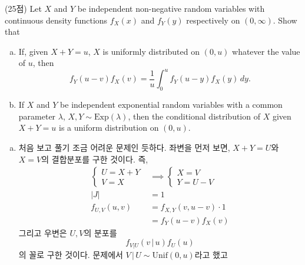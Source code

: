 \documentclass[answers]{exam}
\begin{document}
\newpage
{}
\begin{questions}
   \question
    (25점) Let $X$ and $Y$ be independent non-negative random variables with continuous density functions $f_{X}\left(x\right)$ and $f_{Y}\left(y\right)$ respectively on $\left(0,\infty\right)$. Show that
    \begin{enumerate}[(a)]
      \item If, given $X+Y=u$, $X$ is uniformly distributed on $(0,u)$ whatever the value of $u$, then
      $$
        f_{Y}\left(u-v\right)f_{X}\left(v\right) = \dfrac{1}{u}\int_{0}^{u}f_{Y}\left(u-y\right)f_{X}\left(y\right)\,dy.
      $$
      \item If $X$ and $Y$ be independent exponential random variables with a common parameter $\lambda$, $X,Y\sim \mathrm{Exp}\left(\lambda\right)$, then the conditional distribution of $X$ given $X+Y=u$ is a uniform distribution on $\left(0,u\right)$.
    \end{enumerate}
    \begin{solution}
      \begin{enumerate}[(a)]
        \item 처음 보고 풀기 조금 어려운 문제인 듯하다. 좌변을 먼저 보면, $X+Y=U$와 $X=V$의 결합분포를 구한 것이다. 즉,
        \begin{align}
          \begin{cases}U=X+Y\\V=X  \end{cases} &\implies \begin{cases}X=V\\Y=U-V \end{cases}\\
          \left|J\right| &= 1\\
          f_{U,V}\left(u,v\right) &= f_{X,Y}\left(v,u-v\right)\cdot 1\\
          &= f_{Y}\left(u-v\right)f_{X}\left(v\right)
        \end{align}
        그리고 우변은 $U,V$의 분포를
        \begin{equation}
          f_{V|U}\left(v\,|\,u\right)f_{U}\left(u\right)
        \end{equation}
        의 꼴로 구한 것이다. 문제에서 $V\,|\,U\sim\mathrm{Unif}\left(0,u\right)$라고 했고 
        \begin{align}

\end{align}
\end{enumerate}
\end{solution}
\end{questions}
\end{document}
